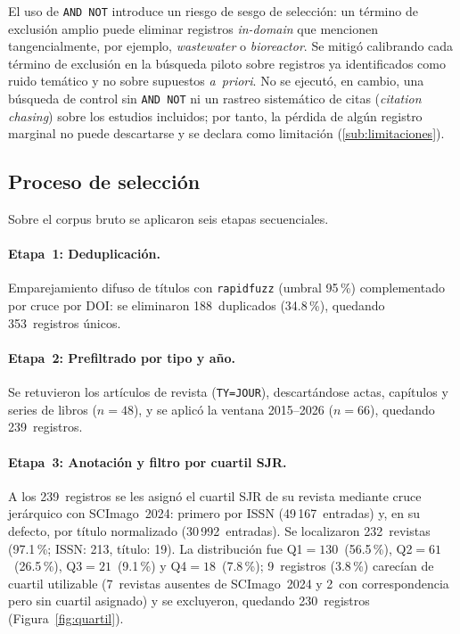 El uso de \texttt{AND~NOT} introduce un riesgo de sesgo de selección: un
término de exclusión amplio puede eliminar registros \textit{in-domain}
que mencionen tangencialmente, por ejemplo, \textit{wastewater} o
\textit{bioreactor}. Se mitigó calibrando cada término de exclusión en la
búsqueda piloto sobre registros ya identificados como ruido temático y no
sobre supuestos \textit{a~priori}. No se ejecutó, en cambio, una búsqueda
de control sin \texttt{AND~NOT} ni un rastreo sistemático de citas
(\textit{citation chasing}) sobre los estudios incluidos; por tanto, la
pérdida de algún registro marginal no puede descartarse y se declara como
limitación (\ref{sub:limitaciones}).


\linenumbers

\subsection{Proceso de selección}
\label{sub:seleccion}

Sobre el corpus bruto se aplicaron seis etapas secuenciales.

\paragraph{Etapa~1: Deduplicación.}
Emparejamiento difuso de títulos con \texttt{rapidfuzz} (umbral 95\,\%)
complementado por cruce por DOI: se eliminaron 188~duplicados (34.8\,\%),
quedando 353~registros únicos.

\paragraph{Etapa~2: Prefiltrado por tipo y año.}
Se retuvieron los artículos de revista (\texttt{TY=JOUR}), descartándose
actas, capítulos y series de libros ($n=48$), y se aplicó la ventana
2015--2026 ($n=66$), quedando 239~registros.

\paragraph{Etapa~3: Anotación y filtro por cuartil SJR.}
A los 239~registros se les asignó el cuartil SJR de su revista mediante
cruce jerárquico con SCImago~2024: primero por ISSN (49\,167~entradas) y,
en su defecto, por título normalizado (30\,992~entradas). Se
localizaron 232~revistas (97.1\,\%; ISSN: 213, título: 19). La
distribución fue Q1$=130$~(56.5\,\%), Q2$=61$~(26.5\,\%),
Q3$=21$~(9.1\,\%) y Q4$=18$~(7.8\,\%); 9~registros (3.8\,\%) carecían de
cuartil utilizable (7~revistas ausentes de SCImago~2024 y 2~con
correspondencia pero sin cuartil asignado) y se excluyeron, quedando
230~registros (Figura~\ref{fig:quartil}).

